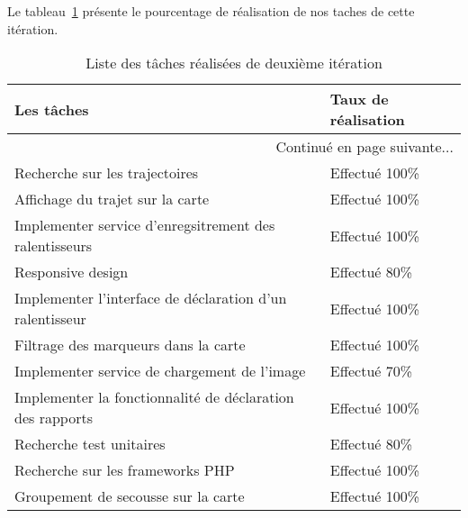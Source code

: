 Le tableau~\ref{tab:sprint2-evaluation} présente le pourcentage de
réalisation de nos taches de cette itération.
\begin{center}
    \begin{longtable}{| l | l |}
        \caption{Liste des tâches réalisées de deuxième itération }
        \label{tab:sprint2-evaluation} \\

        \hline
        \textbf{Les tâches} & \textbf{Taux de réalisation} \\ \hline
        \endhead

        \hline \multicolumn{2}{|r|}{{Continué en page suivante$\dotsc$}} \\ \hline
        \endfoot

        \hline \hline
        \endlastfoot

        \hline
Recherche sur les trajectoires & Effectué 100\% \\ \hline
Affichage du trajet sur la carte & Effectué 100\% \\ \hline
Implementer service d’enregsitrement des ralentisseurs & Effectué 100\% \\ \hline
Responsive design & Effectué 80\% \\ \hline
Implementer l’interface de déclaration d'un ralentisseur & Effectué 100\% \\ \hline
Filtrage des marqueurs dans la carte & Effectué 100\% \\ \hline
Implementer service de chargement de l'image & Effectué 70\% \\ \hline
Implementer la fonctionnalité de déclaration des rapports & Effectué 100\% \\ \hline
Recherche test unitaires & Effectué 80\% \\ \hline
Recherche sur les frameworks PHP & Effectué 100\% \\ \hline
Groupement de secousse sur la carte & Effectué 100\% \\ \hline
    \end{longtable}
\end{center}
